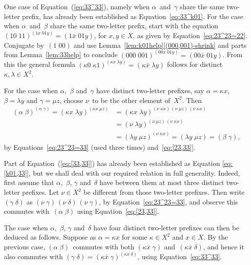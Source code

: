 \documentclass[a4paper,11pt]{article}
\numberwithin{equation}{section}
\newcommand{\eqstate}[1]{Equation~(\ref{#1})}
\newcommand{\swap}[2]{(#1\;#2)}
\begin{document}
One case of \eqstate{eq:33^33}, namely when $\alpha$~and~$\gamma$
share the same two-letter prefix, has already been established as
Equation~\eqref{eq:33^k01}.  For the case when $\alpha$~and~$\beta$
share the same two-letter prefix, start with the equation
$\swap{10}{11}^{\swap{1x}{01y}} = \swap{1\bar{x}}{01y}$, for $x,y \in
X$, as given by Equation~\eqref{eq:23^23=22}.  Conjugate
by~$\swap{1}{00}$ and use
Lemma~\ref{lem:k01help}\ref{(000,001)-shrink} and parts from
Lemma~\ref{lem:33help} to conclude $\swap{000}{001}^{\swap{00x}{01y}}
= \swap{00\bar{x}}{01y}$.  From this the general formula
$\swap{\kappa0}{\kappa1}^{\swap{\kappa x}{\lambda y}} =
\swap{\kappa\bar{x}}{\lambda y}$ follows for distinct $\kappa,\lambda
\in X^{2}$.

For the case when $\alpha$,~$\beta$ and~$\gamma$ have distinct
two-letter prefixes, say $\alpha = \kappa x$, $\beta = \lambda y$ and
$\gamma = \mu z$, choose $\nu$~to be the other element of~$X^{2}$.
Then
\begin{align*}
\swap{\alpha}{\beta}^{\swap{\alpha}{\gamma}} =
\swap{\kappa x}{\lambda y}^{\swap{\kappa x}{\mu z}} &=
\swap{\kappa x}{\lambda y}^{\swap{\nu}{\kappa x} \, \swap{\nu}{\mu z}
  \, \swap{\nu}{\kappa x}} \\
&=
\swap{\nu}{\lambda y}^{\swap{\nu}{\mu z} \, \swap{\nu}{\kappa x}} \\
&= \swap{\lambda y}{\mu z}^{\swap{\nu}{\kappa x}} =
\swap{\lambda y}{\mu z} =
\swap{\beta}{\gamma},
\end{align*}
by Equations~\eqref{eq:23^23=33} (used three times)
and~\eqref{eq:[23,33]}.

Part of \eqstate{eq:[33,33]} has already been established as
Equation \eqref{eq:[k01,33]}, but we shall deal with our required
relation in full generality.  Indeed, first assume that
$\alpha$,~$\beta$, $\gamma$ and~$\delta$ have between them at most
three distinct two-letter prefixes.  Let $\nu \in X^{2}$ be different
from those two-letter prefixes.  Then write $\swap{\gamma}{\delta}$ as
$\swap{\nu}{\gamma} \, \swap{\nu}{\delta} \, \swap{\nu}{\gamma}$, by
Equation~\eqref{eq:23^23=33}, and observe this commutes
with~$\swap{\alpha}{\beta}$ using Equation~\eqref{eq:[23,33]}.

The case when $\alpha$,~$\beta$, $\gamma$ and~$\delta$ have four
distinct two-letter prefixes can then be deduced as follows.  Suppose
as $\alpha = \kappa x$ for some $\kappa \in X^{2}$ and $x \in X$.  By
the previous case, $\swap{\alpha}{\beta}$~commutes with both
$\swap{\kappa\bar{x}}{\gamma}$ and~$\swap{\kappa\bar{x}}{\delta}$, and
hence it also commutes with $\swap{\gamma}{\delta} =
\swap{\kappa\bar{x}}{\gamma}^{\swap{\kappa\bar{x}}{\delta}}$, using
Equation~\eqref{eq:33^33}.
\end{document}
